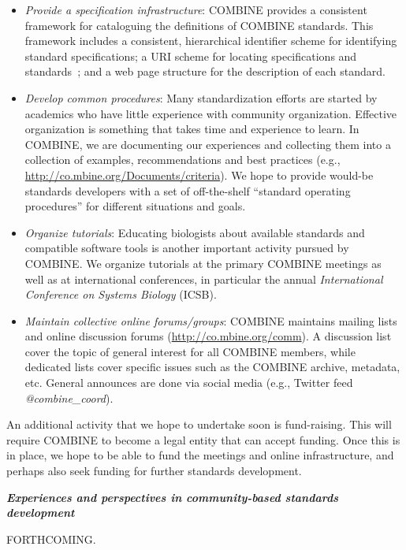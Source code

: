 \begin{itemize}
\item \emph{Provide a specification infrastructure}: COMBINE provides a consistent framework for cataloguing the definitions of COMBINE standards. This framework includes a consistent, hierarchical identifier scheme for identifying standard specifications; a URI scheme for locating specifications and standards~\cite[using Identifiers.org to provide permanent, resolvable URIs for standards;][]{Juty2012}; and a web page structure for the description of each standard.

\item \emph{Develop common procedures}: Many standardization efforts are started by academics who have little experience with community organization.  Effective organization is something that takes time and experience to learn.  In COMBINE, we are documenting our experiences and collecting them into a collection of examples, recommendations and best practices (e.g., \url{http://co.mbine.org/Documents/criteria}).  We hope to provide would-be standards developers with a set of off-the-shelf ``standard operating procedures'' for different situations and goals.

\item \emph{Organize tutorials}: Educating biologists about available standards and compatible software tools is another important activity pursued by COMBINE.  We organize tutorials at the primary COMBINE meetings as well as at international conferences, in particular the annual \emph{International Conference on Systems Biology} (ICSB).

\item \emph{Maintain collective online forums/groups}:  COMBINE maintains mailing lists and online discussion forums (\url{http://co.mbine.org/comm}).  A discussion list cover the topic of general interest for all COMBINE members, while dedicated lists cover specific issues such as the COMBINE archive, metadata, etc.  General announces are done via social media (e.g., Twitter feed \emph{@combine\_coord}).

\end{itemize}


An additional activity that we hope to undertake soon is fund-raising.  This will require COMBINE to become a legal entity that can accept funding.  Once this is in place, we hope to be able to fund the meetings and online infrastructure, and perhaps also seek funding for further standards development.


\clearpage
\textbf{\textsl{Experiences and perspectives in community-based standards development}}

FORTHCOMING.
